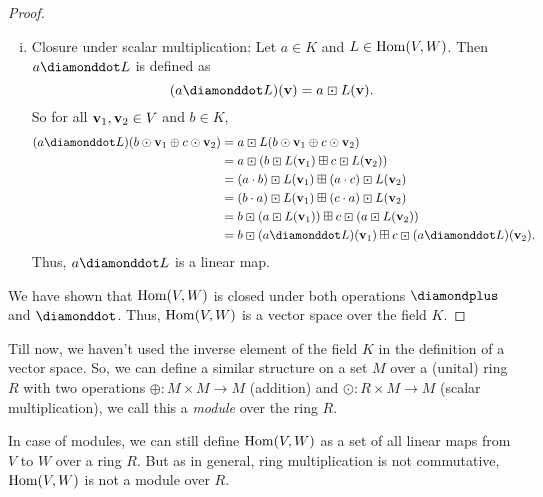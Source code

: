 \begin{proof}
\begin{enumerate}[(i)]
        \item Closure under scalar multiplication:
              Let \(a \in K\) and \(L \in \operatorname{Hom}(V, W)\). Then \(a \diamonddot L\) is defined as
              \begin{equation}
                  (a \diamonddot L)(\vb{v}) = a \boxdot L(\vb{v}).
              \end{equation}
              So for all \(\vb{v}_1, \vb{v}_2 \in V\) and \(b \in K\),
              \begin{align*}
                  (a \diamonddot L)(b \odot \vb{v}_1 \oplus c \odot \vb{v}_2) & = a \boxdot L(b \odot \vb{v}_1 \oplus c \odot \vb{v}_2)                                 \\
                                                                              & = a \boxdot (b \boxdot L(\vb{v}_1) \boxplus c \boxdot L(\vb{v}_2))                      \\
                                                                              & = (a \cdot b) \boxdot L(\vb{v}_1) \boxplus (a \cdot c) \boxdot L(\vb{v}_2)              \\
                                                                              & = (b \cdot a) \boxdot L(\vb{v}_1) \boxplus (c \cdot a) \boxdot L(\vb{v}_2)              \\
                                                                              & = b \boxdot (a \boxdot L(\vb{v}_1)) \boxplus c \boxdot (a \boxdot L(\vb{v}_2))          \\
                                                                              & = b \boxdot (a \diamonddot L)(\vb{v}_1) \boxplus c \boxdot (a \diamonddot L)(\vb{v}_2).
              \end{align*}
              Thus, \(a \diamonddot L\) is a linear map.
    \end{enumerate}
    We have shown that \(\operatorname{Hom}(V, W)\) is closed under both operations \(\diamondplus\) and \(\diamonddot\). Thus, \(\operatorname{Hom}(V, W)\) is a vector space over the field \(K\).
\end{proof}

Till now, we haven't used the inverse element of the field \(K\) in the definition of a vector space. So, we can define a similar structure on a set \(M\) over a (unital) ring \(R\) with two operations \(\oplus: M \times M \to M\) (addition) and \(\odot: R \times M \to M\) (scalar multiplication), we call this a \emph{module} over the ring \(R\).

\begin{remark}
    In case of modules, we can still define \(\operatorname{Hom}(V, W)\) as a set of all linear maps from \(V\) to \(W\) over a ring \(R\). But as in general, ring multiplication is not commutative, \(\operatorname{Hom}(V, W)\) is not a module over \(R\).
\end{remark}

